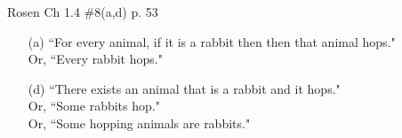 \documentclass[12pt,addpoints]{exam}
\newcommand{\ra}{\rightarrow}
\begin{document}
\begin{questions}
\question[4] Rosen Ch 1.4 \#8(a,d) p. 53
    \begin{solution}
    \begin{itemize}
        \item[(a)] ``For every animal, if it is a rabbit then then that animal hops."  \\Or, ``Every rabbit hops."
        \item[(d)] ``There exists an animal that is a rabbit and it hops." \\Or, ``Some rabbits hop." \\Or, ``Some hopping animals are rabbits."
    \end{itemize}
    \end{solution}



\end{questions}
\end{document}
